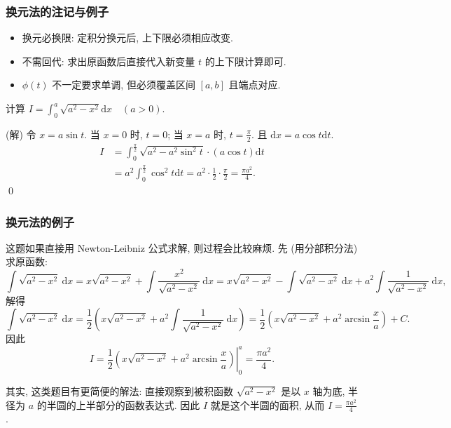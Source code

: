 \begin{frame}
\frametitle{换元法的注记与例子}

\begin{remark}
\begin{itemize}
\item \alert{换元必换限}: 定积分换元后, 上下限必须相应改变.
\item \alert{不需回代}: 求出原函数后直接代入新变量 $t$ 的上下限计算即可.
\item $\phi(t)$ 不一定要求单调, 但必须覆盖区间 $[a, b]$ 且端点对应.
\end{itemize}
\end{remark}

\pause
\vspace{1em}

\begin{eg}
计算 $I = \int_0^a \sqrt{a^2 - x^2} \mathrm{d}x \quad (a > 0)$.
\end{eg}

\vspace{0.5em}
\startproof[bg=yellow, fg=red](解)
令 $x = a \sin t$.
当 $x=0$ 时, $t=0$; 当 $x=a$ 时, $t=\frac{\pi}{2}$.
且 $\mathrm{d}x = a \cos t \mathrm{d}t$.
\begin{align*}
I &= \int_0^{\frac{\pi}{2}} \sqrt{a^2 - a^2 \sin^2 t} \cdot (a \cos t) \mathrm{d}t \\
  &= a^2 \int_0^{\frac{\pi}{2}} \cos^2 t \mathrm{d}t = a^2 \cdot \frac{1}{2} \cdot \frac{\pi}{2} = \frac{\pi a^2}{4}.
\end{align*}
\qed

\end{frame}


\begin{frame}
\frametitle{换元法的例子}

这题如果直接用 Newton-Leibniz 公式求解, 则过程会比较麻烦. 先 (用分部积分法) 求原函数:
\[
\int \sqrt{a^2 - x^2} ~ \mathrm{d}x = x \sqrt{a^2 - x^2} + \int \frac{x^2}{\sqrt{a^2 - x^2}} ~ \mathrm{d}x = x \sqrt{a^2 - x^2} - \int \sqrt{a^2 - x^2} ~ \mathrm{d}x + a^2 \int \frac{1}{\sqrt{a^2 - x^2}} ~ \mathrm{d}x,
\]
解得
\[
\int \sqrt{a^2 - x^2} ~ \mathrm{d}x = \frac{1}{2} \left( x \sqrt{a^2 - x^2} + a^2 \int \frac{1}{\sqrt{a^2 - x^2}} ~ \mathrm{d}x \right) = \frac{1}{2} \left( x \sqrt{a^2 - x^2} + a^2 \arcsin \frac{x}{a} \right) + C.
\]
因此
\[
I = \left. \frac{1}{2} \left( x \sqrt{a^2 - x^2} + a^2 \arcsin \frac{x}{a} \right) \right|_0^a = \frac{\pi a^2}{4}.
\]

\pause
\vspace{1em}

其实, 这类题目有更简便的解法: 直接观察到被积函数 $\sqrt{a^2 - x^2}$ 是以 $x$ 轴为底, 半径为 $a$ 的半圆的上半部分的函数表达式. 因此 $I$ 就是这个半圆的面积, 从而 $I = \frac{\pi a^2}{4}$.

\end{frame}

